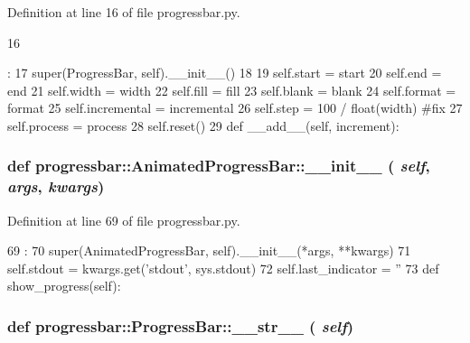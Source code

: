 Definition at line 16 of file progressbar.py.


\begin{DoxyCode}
16                                                                                  
                                                                                       
              :
17         super(ProgressBar, self).__init__()
18 
19         self.start = start
20         self.end = end
21         self.width = width
22         self.fill = fill
23         self.blank = blank
24         self.format = format
25         self.incremental = incremental
26         self.step = 100 / float(width) #fix
27         self.process = process
28         self.reset()
29 
    def __add__(self, increment):
\end{DoxyCode}
\hypertarget{classprogressbar_1_1AnimatedProgressBar_a30d884afb012f2565e7ef52df5176a89}{
\subsubsection[{\_\-\_\-init\_\-\_\-}]{\setlength{\rightskip}{0pt plus 5cm}def progressbar::AnimatedProgressBar::\_\-\_\-init\_\-\_\- ( {\em self}, \/   {\em args}, \/   {\em kwargs})}}
\label{classprogressbar_1_1AnimatedProgressBar_a30d884afb012f2565e7ef52df5176a89}


Definition at line 69 of file progressbar.py.


\begin{DoxyCode}
69                                        :
70         super(AnimatedProgressBar, self).__init__(*args, **kwargs)
71         self.stdout = kwargs.get('stdout', sys.stdout)
72         self.last_indicator = ''
73 
    def show_progress(self):
\end{DoxyCode}
\hypertarget{classprogressbar_1_1ProgressBar_ad7acb97d5893c7c67d9e1c8224364df9}{
\subsubsection[{\_\-\_\-str\_\-\_\-}]{\setlength{\rightskip}{0pt plus 5cm}def progressbar::ProgressBar::\_\-\_\-str\_\-\_\- ( {\em self})}}
\label{classprogressbar_1_1ProgressBar_ad7acb97d5893c7c67d9e1c8224364df9}


